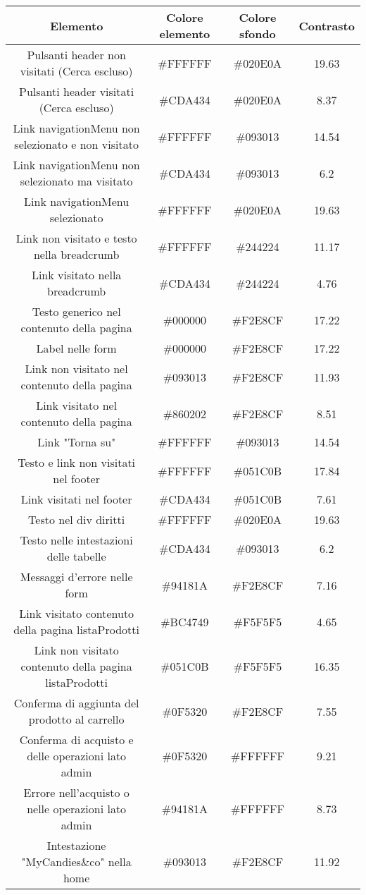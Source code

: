 
\begin{longtable}{|c|c|c|c|}
\hline
\textbf{Elemento} & \textbf{Colore elemento} & \textbf{Colore sfondo} & \textbf{Contrasto}  \\ \hline

    Pulsanti header non visitati (Cerca escluso) & \#FFFFFF & \#020E0A & 19.63  \\ \hline
    Pulsanti header visitati (Cerca escluso) & \#CDA434 & \#020E0A & 8.37  \\ \hline
    Link navigationMenu non selezionato e non visitato & \#FFFFFF & \#093013 & 14.54  \\ \hline
    Link navigationMenu non selezionato ma visitato & \#CDA434 & \#093013 & 6.2  \\ \hline
    Link navigationMenu selezionato & \#FFFFFF & \#020E0A & 19.63  \\ \hline
    Link non visitato e testo nella breadcrumb & \#FFFFFF & \#244224 & 11.17  \\ \hline
    Link visitato nella breadcrumb & \#CDA434 & \#244224 & 4.76  \\ \hline
    Testo generico nel contenuto della pagina & \#000000 & \#F2E8CF  & 17.22 \\ \hline
    Label nelle form & \#000000 & \#F2E8CF  & 17.22 \\ \hline
    Link non visitato nel contenuto della pagina & \#093013 & \#F2E8CF  & 11.93 \\ \hline
    Link visitato nel contenuto della pagina & \#860202 & \#F2E8CF  & 8.51 \\ \hline
    Link "Torna su" & \#FFFFFF & \#093013 & 14.54  \\ \hline
    Testo e link non visitati nel footer & \#FFFFFF & \#051C0B & 17.84 \\ \hline
    Link visitati nel footer & \#CDA434 & \#051C0B & 7.61 \\ \hline
    Testo nel div diritti & \#FFFFFF & \#020E0A & 19.63 \\ \hline
    Testo nelle intestazioni delle tabelle & \#CDA434 & \#093013 & 6.2  \\ \hline
    Messaggi d'errore nelle form & \#94181A & \#F2E8CF  & 7.16 \\ \hline
    Link visitato contenuto della pagina listaProdotti & \#BC4749 & \#F5F5F5 & 4.65 \\ \hline
    Link non visitato contenuto della pagina listaProdotti & \#051C0B & \#F5F5F5 & 16.35 \\ \hline
    Conferma di aggiunta del prodotto al carrello & \#0F5320 & \#F2E8CF  & 7.55\\ \hline
    Conferma di acquisto e delle operazioni lato admin & \#0F5320 & \#FFFFFF & 9.21 \\ \hline
    Errore nell'acquisto o nelle operazioni lato admin & \#94181A & \#FFFFFF & 8.73 \\ \hline
    Intestazione "MyCandies\&co" nella home & \#093013 & \#F2E8CF & 11.92 \\ \hline
\end{longtable}

